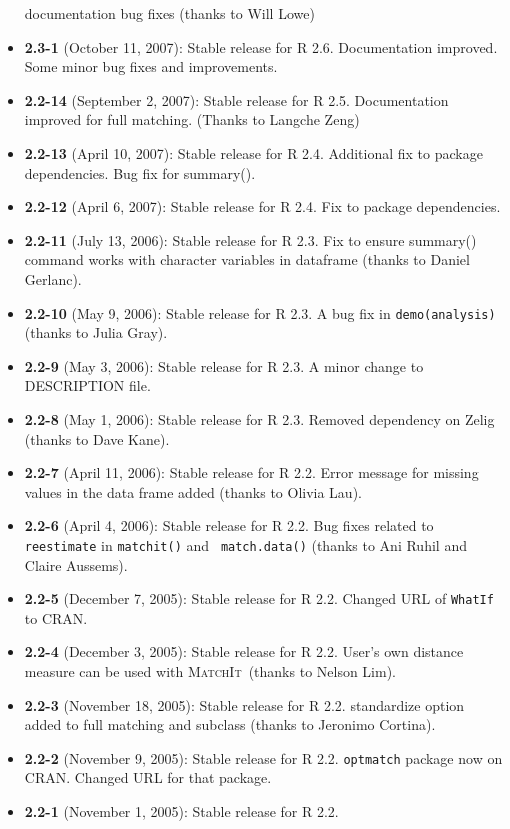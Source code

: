 \documentclass[oneside,letterpaper,12pt]{book}
\newcommand{\MatchIt}{\textsc{MatchIt}}
\begin{document}
\begin{itemize}
  documentation bug fixes (thanks to Will Lowe)
\item \textbf{2.3-1} (October 11, 2007): Stable release for R
  2.6. Documentation improved. Some minor bug fixes and improvements.
\item \textbf{2.2-14} (September 2, 2007): Stable release for R 2.5.
  Documentation improved for full matching. (Thanks to Langche Zeng)
\item \textbf{2.2-13} (April 10, 2007): Stable release for R
  2.4. Additional fix to package dependencies. Bug fix for summary().
\item \textbf{2.2-12} (April 6, 2007): Stable release for R 2.4. Fix
  to package dependencies.
\item \textbf{2.2-11} (July 13, 2006): Stable release for R 2.3.
  Fix to ensure summary() command works with character variables in dataframe (thanks to Daniel Gerlanc).
\item \textbf{2.2-10} (May 9, 2006): Stable release for R 2.3.
  A bug fix in {\tt demo(analysis)} (thanks to Julia Gray).
\item \textbf{2.2-9} (May 3, 2006): Stable release for R 2.3.
  A minor change to DESCRIPTION file.
\item \textbf{2.2-8} (May 1, 2006): Stable release for R 2.3.
  Removed dependency on Zelig (thanks to Dave Kane).
\item \textbf{2.2-7} (April 11, 2006): Stable release for R 2.2.
  Error message for missing values in the data frame added
  (thanks to Olivia Lau).
\item \textbf{2.2-6} (April 4, 2006): Stable release for R 2.2.
  Bug fixes related to {\tt reestimate} in {\tt matchit()} and {\tt
  match.data()} (thanks to Ani Ruhil and Claire Aussems). 
\item \textbf{2.2-5} (December 7, 2005): Stable release for R 2.2.
  Changed URL of {\tt WhatIf} to CRAN.
\item \textbf{2.2-4} (December 3, 2005): Stable release for R 2.2.
  User's own distance measure can be used with \MatchIt\, (thanks to
  Nelson Lim).
\item \textbf{2.2-3} (November 18, 2005): Stable release for R 2.2.
  standardize option added to full matching and subclass (thanks to
  Jeronimo Cortina).
\item \textbf{2.2-2} (November 9, 2005): Stable release for R 2.2.
  {\tt optmatch} package now on CRAN. Changed URL for that package. 
\item \textbf{2.2-1} (November 1, 2005): Stable release for R 2.2.

\end{itemize}
\end{document}
